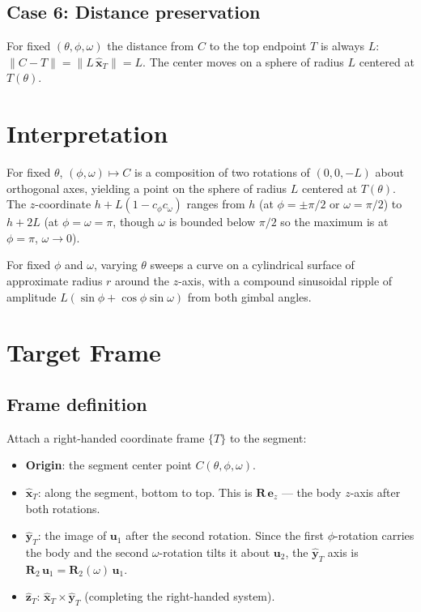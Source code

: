\documentclass[12pt,a4paper]{article}
\newcommand{\uva}{\mathbf{u}_1}
\newcommand{\uvb}{\mathbf{u}_2}
\newcommand{\cross}{\times}
\newcommand{\Rd}{\mathbf{R}}
\newcommand{\Rtwo}{\Rd_2}
\newcommand{\Rcom}{\Rd}
\begin{document}
\subsection*{Case 6: Distance preservation}

For fixed $(\theta,\phi,\omega)$ the distance from $C$ to the top endpoint $T$ is always $L$:
$\|C - T\| = \|L\,\hat{\mathbf{x}}_T\| = L$.  The center moves on a sphere of radius $L$
centered at $T(\theta)$. 

\section{Interpretation}

For fixed $\theta$, $(\phi,\omega) \mapsto C$ is a composition of two rotations
of $(0,0,-L)$ about orthogonal axes, yielding a point on the sphere of radius $L$
centered at $T(\theta)$.  The $z$-coordinate $h + L(1 - c_\phi c_\omega)$ ranges
from $h$ (at $\phi=\pm\pi/2$ or $\omega=\pi/2$) to $h+2L$ (at $\phi=\omega=\pi$,
though $\omega$ is bounded below $\pi/2$ so the maximum is at $\phi=\pi$, $\omega\to0$).

For fixed $\phi$ and $\omega$, varying $\theta$ sweeps a curve on a cylindrical
surface of approximate radius $r$ around the $z$-axis, with a compound sinusoidal
ripple of amplitude $L(\sin\phi + \cos\phi\sin\omega)$ from both gimbal angles.

\section{Target Frame}

\subsection{Frame definition}

Attach a right-handed coordinate frame $\{T\}$ to the segment:

\begin{itemize}[leftmargin=*]
  \item \textbf{Origin}: the segment center point $C(\theta,\phi,\omega)$.
  \item \textbf{$\hat{\mathbf{x}}_T$}: along the segment, bottom to top.
    This is $\Rcom\,\mathbf{e}_z$ --- the body $z$-axis after both rotations.
  \item \textbf{$\hat{\mathbf{y}}_T$}: the image of $\uva$ after the second rotation.
    Since the first $\phi$-rotation carries the body and the second $\omega$-rotation
    tilts it about $\uvb$, the $\hat{\mathbf{y}}_T$ axis is
    $\Rtwo\,\uva = \Rtwo(\omega)\,\uva$.
  \item \textbf{$\hat{\mathbf{z}}_T$}: $\hat{\mathbf{x}}_T \cross \hat{\mathbf{y}}_T$
    (completing the right-handed system).
\end{itemize}
\end{document}
